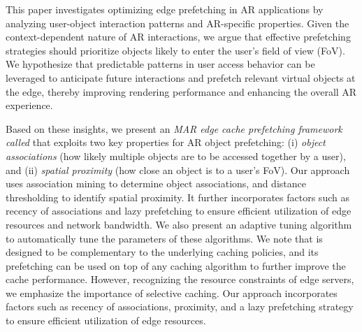 

    This paper investigates optimizing edge prefetching in AR applications by analyzing user-object interaction patterns and AR-specific properties. Given the context-dependent nature of AR interactions, we argue that effective prefetching strategies should prioritize objects likely to enter the user's field of view (FoV).  We hypothesize that predictable patterns in user access behavior can be leveraged to anticipate future interactions and prefetch relevant virtual objects at the edge, thereby improving rendering performance and enhancing the overall AR experience. 
    
    Based on these insights, we present an {\em MAR edge cache prefetching framework called \spaarc{}} that exploits two key properties for AR object prefetching: (i) {\em object associations} (how likely multiple objects are to be accessed together by a user), and (ii) {\em spatial proximity} (how close an object is to a user's FoV). Our approach uses association mining to determine object associations, and distance thresholding to identify spatial proximity. It further incorporates factors such as recency of associations and lazy prefetching to ensure efficient utilization of edge resources and network bandwidth. We also present an adaptive tuning algorithm to automatically tune the parameters of these algorithms. 
    We note that \spaarc{} is designed to be complementary to the underlying caching policies, and its prefetching can be used on top of any caching algorithm to further improve the cache performance.
    However, recognizing the resource constraints of edge servers, we emphasize the importance of selective caching. Our approach incorporates factors such as recency of associations, proximity, and a lazy prefetching strategy to ensure efficient utilization of edge resources.
    \fi
    
